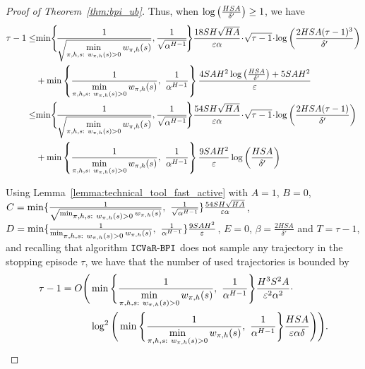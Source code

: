 \begin{proof}[Proof of Theorem~\ref{thm:bpi_ub}]
	
	Thus, when $\log\left( \frac{HSA}{\delta'} \right) \geq 1$, we have
	\begin{align*}
		\tau-1 \leq & \!\min\! \Bigg\{\!\frac{ 1 }{\sqrt{\min \limits_{\begin{subarray}{c}\pi,h,s:\  w_{\pi,h}(s)>0\end{subarray}} w_{\pi,h}(s)}}, \frac{1}{\sqrt{\alpha^{H-1}}} \!\Bigg\} \frac{18SH\sqrt{HA}}{\varepsilon \alpha } \!\cdot\! \sqrt{\tau-1} \!\cdot\! \log\sbr{\frac{2HSA(\tau-1)^3}{\delta'}} \\& + \min \lbr{\frac{ 1 }{\min \limits_{\begin{subarray}{c}\pi,h,s:\  w_{\pi,h}(s)>0\end{subarray}} w_{\pi,h}(s)},\ \frac{1}{\alpha^{H-1}}}  \frac{ 4SAH^2 \log\sbr{\frac{HSA}{\delta'}} + 5SAH^2  }{\varepsilon} 
		\\
		\leq & \!\min\! \Bigg\{\!\frac{ 1 }{\sqrt{\min \limits_{\begin{subarray}{c}\pi,h,s:\  w_{\pi,h}(s)>0\end{subarray}} w_{\pi,h}(s)}}, \frac{1}{\sqrt{\alpha^{H-1}}} \!\Bigg\} \frac{54SH\sqrt{HA}}{\varepsilon \alpha } \!\cdot\! \sqrt{\tau-1} \!\cdot\! \log\sbr{\frac{2HSA(\tau-1)}{\delta'}} \\& + \min \lbr{\frac{ 1 }{\min \limits_{\begin{subarray}{c}\pi,h,s:\  w_{\pi,h}(s)>0\end{subarray}} w_{\pi,h}(s)},\ \frac{1}{\alpha^{H-1}}} \frac{ 9SAH^2 }{\varepsilon} \log\sbr{\frac{HSA}{\delta'}}
	\end{align*}
	
	Using Lemma~\ref{lemma:technical_tool_fast_active} with $A=1$, $B=0$, $C= \min \{\frac{ 1 }{\sqrt{\min_{\begin{subarray}{c}\pi,h,s:\  w_{\pi,h}(s)>0\end{subarray}} w_{\pi,h}(s)}},\ \frac{1}{\sqrt{\alpha^{H-1}}} \} \frac{54SH\sqrt{HA}}{\varepsilon \alpha }$, $D= \min \{\frac{ 1 }{\min_{\begin{subarray}{c}\pi,h,s:\  w_{\pi,h}(s)>0\end{subarray}} w_{\pi,h}(s)},\ \frac{1}{\alpha^{H-1}} \} \frac{ 9SAH^2 }{\varepsilon} $, $E=0$, $\beta=\frac{2HSA}{\delta'}$ and $T=\tau-1$, and recalling that algorithm $\mathtt{ICVaR\mbox{-}BPI}$ does not sample any trajectory in the stopping episode $\tau$, we have that the number of used trajectories is bounded by
	\begin{align*}
		\tau-1 = O \Bigg( & \min \Bigg\{\frac{ 1 }{\min \limits_{\begin{subarray}{c}\pi,h,s:\  w_{\pi,h}(s)>0\end{subarray}} w_{\pi,h}(s)},\ \frac{1}{\alpha^{H-1}} \Bigg\} \frac{ H^3 S^2 A}{\varepsilon^2 \alpha^2 } \cdot \\& \log^2 \Bigg( \min \Bigg\{\frac{ 1 }{\min \limits_{\begin{subarray}{c}\pi,h,s:\  w_{\pi,h}(s)>0\end{subarray}} w_{\pi,h}(s)},\ \frac{1}{\alpha^{H-1}} \Bigg\} \frac{HSA}{ \varepsilon \alpha \delta } \Bigg) \Bigg) .
	\end{align*}
\end{proof}



